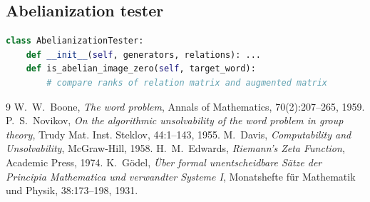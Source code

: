 \documentclass[11pt,a4paper]{article}
\begin{document}
\subsection{Abelianization tester}
\begin{lstlisting}[language=Python]
class AbelianizationTester:
    def __init__(self, generators, relations): ...
    def is_abelian_image_zero(self, target_word):
        # compare ranks of relation matrix and augmented matrix
\end{lstlisting}

\begin{thebibliography}{9}
 W.~W.~Boone, \emph{The word problem}, Annals of Mathematics, 70(2):207–265, 1959.
 P.~S.~Novikov, \emph{On the algorithmic unsolvability of the word problem in group theory}, Trudy Mat. Inst. Steklov, 44:1–143, 1955.
 M.~Davis, \emph{Computability and Unsolvability}, McGraw-Hill, 1958.
 H.~M.~Edwards, \emph{Riemann's Zeta Function}, Academic Press, 1974.
 K.~G\"odel, \emph{\"Uber formal unentscheidbare S\"atze der Principia Mathematica und verwandter Systeme I}, Monatshefte f\"ur Mathematik und Physik, 38:173–198, 1931.
\end{thebibliography}
\end{document}

